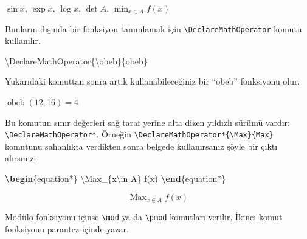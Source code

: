 \documentclass[
  10pt,
]{scrbook}
\newenvironment{Shaded}{}{}
\newcommand{\ExtensionTok}[1]{#1}
\newcommand{\FunctionTok}[1]{\textcolor[rgb]{0.02,0.16,0.49}{#1}}
\newcommand{\KeywordTok}[1]{\textcolor[rgb]{0.00,0.44,0.13}{\textbf{#1}}}
\newcommand{\NormalTok}[1]{#1}
\newcommand{\SpecialCharTok}[1]{\textcolor[rgb]{0.25,0.44,0.63}{#1}}
\newcommand{\SpecialStringTok}[1]{\textcolor[rgb]{0.73,0.40,0.53}{#1}}
\DeclareMathOperator{\obeb}{obeb}
\DeclareMathOperator*{\Max}{Max}
\theoremstyle{definition}
\theoremstyle{definition}
\theoremstyle{definition}
\theoremstyle{definition}
\theoremstyle{remark}
\begin{document}
\(\sin x\), \(\exp x\), \(\log x\), \(\det A\), \(\min_{x\in A} f(x)\)

Bunların dışında bir fonksiyon tanımlamak için \texttt{\textbackslash{}DeclareMathOperator} komutu kullanılır.

\begin{Shaded}
\begin{Highlighting}[]
\FunctionTok{\textbackslash{}DeclareMathOperator}\NormalTok{\{}\FunctionTok{\textbackslash{}obeb}\NormalTok{\}\{obeb\}}
\end{Highlighting}
\end{Shaded}

Yukarıdaki komuttan sonra artık kullanabileceğiniz bir ``obeb'' fonksiyonu olur.

\begin{Shaded}
\end{Shaded}

\(\obeb(12,16)=4\)

Bu komutun sınır değerleri sağ taraf yerine alta dizen yıldızlı sürümü vardır: \texttt{\textbackslash{}DeclareMathOperator*}. Örneğin \texttt{\textbackslash{}DeclareMathOperator*\{\textbackslash{}Max\}\{Max\}} komutunu sahanlıkta verdikten sonra belgede kullanırsanız şöyle bir çıktı alırsınız:

\begin{Shaded}
\begin{Highlighting}[]
\KeywordTok{\textbackslash{}begin}\NormalTok{\{}\ExtensionTok{equation*}\NormalTok{\}}
\SpecialStringTok{ }\SpecialCharTok{\textbackslash{}Max}\SpecialStringTok{\_\{x}\SpecialCharTok{\textbackslash{}in}\SpecialStringTok{ A\} f(x)}
\KeywordTok{\textbackslash{}end}\NormalTok{\{}\ExtensionTok{equation*}\NormalTok{\}}
\end{Highlighting}
\end{Shaded}

\begin{equation*}
 \Max_{x\in A} f(x)
\end{equation*}

Modülo fonksiyonu içinse \texttt{\textbackslash{}mod} ya da \texttt{\textbackslash{}pmod} komutları verilir. İkinci komut fonksiyonu parantez içinde yazar.

\begin{Shaded}
\end{Shaded}
\end{document}

